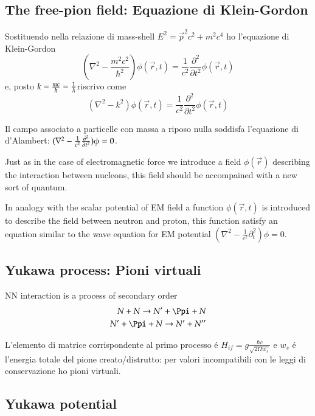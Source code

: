 \documentclass[main.tex]{subfiles}
\begin{document}
\subsection{The free-pion field: Equazione di Klein-Gordon}
Sostituendo  nella relazione di mass-shell $E^2=\vec{p}^2c^2+m^2c^4$ ho l'equazione di Klein-Gordon
\begin{equation*}
(\nabla^2-\frac{m^2c^2}{\hbar^2})\phi(\vec{r},t)=\frac{1}{c^2}\frac{\partial^2}{\partial t^2}\phi(\vec{r},t)
\end{equation*}
e, posto $k=\frac{mc}{\hbar}=\frac{1}{\lambdabar}$riscrivo come
\begin{equation*}
(\nabla^2-k^2)\phi(\vec{r},t)=\frac{1}{c^2}\frac{\partial^2}{\partial t^2}\phi(\vec{r},t)
\end{equation*}

Il campo associato a particelle con massa a riposo nulla soddisfa l'equazione di d'Alambert: $(\nabla^2-\frac{1}{c^2}\frac{\partial^2}{\partial t^2})\phi=0$.

Just as in the case of electromagnetic force we introduce a field $\phi(\vec{r})$ describing the interaction between nucleons, this field should be accompained with a new sort of quantum.

In analogy with the scalar potential of EM field a function $\phi(\vec{r},t)$  is introduced to describe the field between neutron and proton, this function satisfy an equation similar to the wave equation for EM potential $(\nabla^2-\frac{1}{c^2}\partial^2_t)\phi=0$. 


\subsection{Yukawa process: Pioni virtuali}

NN interaction is a process of secondary order
\begin{align*}
N+N\to N'+\Ppi+N\\
N'+\Ppi+N\to N'+N''
\end{align*}

L'elemento di matrice corrispondente al primo processo \'e $H_{if}=g\frac{\hbar c}{\sqrt{2\Omega w_s}}$ e $w_s$ \'e l'energia totale del pione creato/distrutto: per valori incompatibili con le leggi di conservazione ho pioni virtuali.

\subsection{Yukawa potential}
\end{document}
